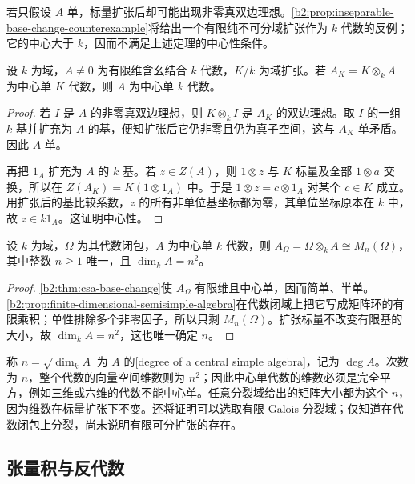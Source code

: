 若只假设 \(A\) 单，标量扩张后却可能出现非零真双边理想。\cref{b2:prop:inseparable-base-change-counterexample}将给出一个有限纯不可分域扩张作为 \(k\) 代数的反例；它的中心大于 \(k\)，因而不满足上述定理的中心性条件。

\begin{proposition}[中心单性的下降]\label{b2:prop:csa-descent-from-extension}
	设 \(k\) 为域，\(A\ne0\) 为有限维含幺结合 \(k\) 代数，\(K/k\) 为域扩张。若 \(A_K=K\otimes_kA\) 为中心单 \(K\) 代数，则 \(A\) 为中心单 \(k\) 代数。
\end{proposition}
\begin{proof}
	若 \(I\) 是 \(A\) 的非零真双边理想，则 \(K\otimes_kI\) 是 \(A_K\) 的双边理想。取 \(I\) 的一组 \(k\) 基并扩充为 \(A\) 的基，便知扩张后它仍非零且仍为真子空间，这与 \(A_K\) 单矛盾。因此 \(A\) 单。

	再把 \(1_A\) 扩充为 \(A\) 的 \(k\) 基。若 \(z\in Z(A)\)，则 \(1\otimes z\) 与 \(K\) 标量及全部 \(1\otimes a\) 交换，所以在 \(Z(A_K)=K(1\otimes1_A)\) 中。于是 \(1\otimes z=c\otimes1_A\) 对某个 \(c\in K\) 成立。用扩张后的基比较系数，\(z\) 的所有非单位基坐标都为零，其单位坐标原本在 \(k\) 中，故 \(z\in k1_A\)。这证明中心性。
\end{proof}

\begin{corollary}\label{b2:cor:csa-algebraic-closure-splits}
	设 \(k\) 为域，\(\Omega\) 为其代数闭包，\(A\) 为中心单 \(k\) 代数，则 \(A_\Omega=\Omega\otimes_kA\cong M_n(\Omega)\)，其中整数 \(n\geq1\) 唯一，且 \(\dim_kA=n^2\)。
\end{corollary}
\begin{proof}
	\cref{b2:thm:csa-base-change}使 \(A_\Omega\) 有限维且中心单，因而简单、半单。\cref{b2:prop:finite-dimensional-semisimple-algebra}在代数闭域上把它写成矩阵环的有限乘积；单性排除多个非零因子，所以只剩 \(M_n(\Omega)\)。扩张标量不改变有限基的大小，故 \(\dim_kA=n^2\)，这也唯一确定 \(n\)。
\end{proof}

称 \(n=\sqrt{\dim_kA}\) 为 \(A\) 的[degree of a central simple algebra]，记为 \(\deg A\)。次数为 \(n\)，整个代数的向量空间维数则为 \(n^2\)；因此中心单代数的维数必须是完全平方，例如三维或六维的代数不能中心单。任意分裂域给出的矩阵大小都为这个 \(n\)，因为维数在标量扩张下不变。还将证明可以选取有限 Galois 分裂域；仅知道在代数闭包上分裂，尚未说明有限可分扩张的存在。

\subsection{张量积与反代数}
\label{b2:subsec:1701:03}

